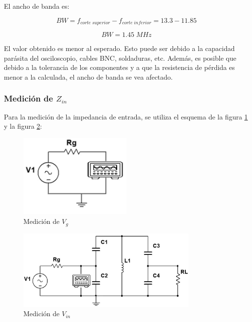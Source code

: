 El ancho de banda es:

\begin{equation}
    BW = f_{corte\; superior} - f_{corte\; inferior} = 13.3 - 11.85
\end{equation}

\begin{equation}
    \boxed{BW = 1.45\; MHz}
\end{equation}

El valor obtenido es menor al esperado. Esto puede ser debido a la capacidad parásita del osciloscopio, cables BNC, soldaduras, etc. Además, es posible
que debido a la tolerancia de los componentes y a que la resistencia de pérdida es menor a la calculada, el ancho de banda se vea afectado.

\subsubsection{Medición de $Z_{in}$}

Para la medición de la impedancia de entrada, se utiliza el esquema de la figura \ref{fig: de la medición de la impedancia de entrada}
y la figura \ref{fig: de la medición de la impedancia de entrada 2}:

\begin{figure}[h]
    \centering
    \includegraphics[width=0.5\textwidth]{Imagenes/medicion_zin1.png}
    \caption{Medición de $V_g$}
    \label{fig: de la medición de la impedancia de entrada}
\end{figure}

\newpage

\begin{figure}[h]
    \centering
    \includegraphics[width=0.8\textwidth]{Imagenes/medicion_zin2.png}
    \caption{Medición de $V_{in}$}
    \label{fig: de la medición de la impedancia de entrada 2}
\end{figure}

